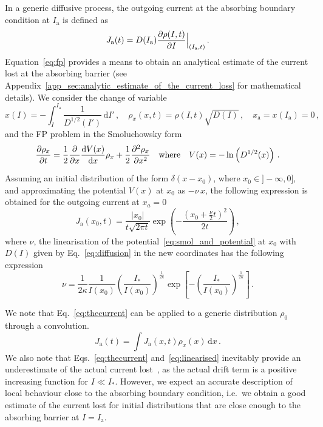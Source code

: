 {In a generic diffusive process, the outgoing current at the absorbing boundary condition at $I_\mathrm{a}$ is defined as
\begin{equation}
    J_\mathrm{a}(t) = D(I_\mathrm{a})\pdv{\rho(I, t)}{I} \Bigr|_{(I_\mathrm{a}, t)}\,.
    \label{eq:outgoing_current_definition}
\end{equation}
Equation~\eqref{eq:fp} provides a means to obtain an analytical estimate of the current lost at the absorbing barrier (see Appendix~\ref{app_sec:analytic_estimate_of_the_current_loss} for mathematical details). We consider the change of variable
\begin{equation}
    x(I) = -\int_I^{I_\mathrm{a}} \frac{1}{D^{1/2}(I')}\,\mathrm{d}I' \,, \quad \rho_x(x,t) = \rho(I, t) \sqrt{D(I)} \,, \quad x_\mathrm{a}=x(I_\mathrm{a})=0 \, ,
    \label{eq:change_of_variable}
\end{equation}
and the FP problem in the Smoluchowsky form
\begin{equation}
    \pdv{\rho_x}{t} = \frac{1}{2}\pdv{x} \dv{V(x)}{x} \rho_x+\frac{1}{2}\pdv[2]{\rho_x}{x} \quad \text{where} \quad V(x) = -\ln\left(D^{1/2}(x)\right) \, .
    \label{eq:smol_and_potential}
\end{equation}

Assuming an initial distribution of the form $\delta(x - x_0)$, where $x_0 \in ] -\infty, 0]$, and approximating the potential $V(x)$ at $x_0$ as $-\nu \, x$, the following expression is obtained for the outgoing current at $x_a = 0$
\begin{equation}
    J_\mathrm{a}(x_0, t) = \frac{|x_0|}{t\sqrt{2\pi t}}\exp\left(-\frac{(x_0+\frac{\nu}{2}t)^2}{2t}\right) \,,
    \label{eq:thecurrent}
\end{equation}
where $\nu$, the linearisation of the potential~\eqref{eq:smol_and_potential} at $x_0$ with $D(I)$ given by Eq.~\eqref{eq:diffusion} in the new coordinates has the following expression
\begin{equation}
    \nu=\frac{1}{2\kappa}\frac{1}{I(x_0)}\left(\frac{I_\ast}{I(x_0)}\right)^{\frac{1}{2\kappa}}\exp\left[-\left(\frac{I_\ast}{I(x_0)}\right)^{\frac{1}{2\kappa}}\right]\,.
    \label{eq:linearised}
\end{equation}

We note that Eq.~\eqref{eq:thecurrent} can be applied to a generic distribution $\rho_0$ through a convolution.
\begin{equation}
    J_\mathrm{a}(t) = \int J_\mathrm{a}(x,t)\rho_x(x)\,\mathrm{d}x\,.
    \label{eq:current_convolution}
\end{equation}
We also note that Eqs.~\eqref{eq:thecurrent} and~\eqref{eq:linearised} inevitably provide an underestimate of the actual current lost~\cite{montanari:ipac2021:tupab233}, as the actual drift term is a positive increasing function for $I\ll I_\ast$. However, we expect an accurate description of local behaviour close to the absorbing boundary condition, i.e.\ we obtain a good estimate of the current lost for initial distributions that are close enough to the absorbing barrier at $I=I_\mathrm{a}$. 

}
